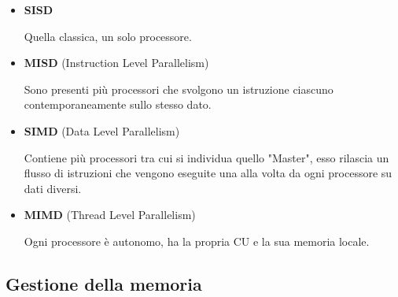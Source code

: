 \documentclass{article}
\begin{document}
\begin{itemize}
    \item \textbf{SISD}

        Quella classica, un solo processore.

    \item \textbf{MISD} (Instruction Level Parallelism)

        Sono presenti più processori che svolgono un istruzione ciascuno contemporaneamente sullo stesso dato.

    \item \textbf{SIMD} (Data Level Parallelism)

        Contiene più processori tra cui si individua quello "Master", esso rilascia un flusso di istruzioni che vengono eseguite una alla volta da ogni processore su dati diversi. 

    \item \textbf{MIMD} (Thread Level Parallelism)

        Ogni processore è autonomo, ha la propria CU e la sua memoria locale.\newline
    
\end{itemize}

\subsection{Gestione della memoria}
\end{document}
